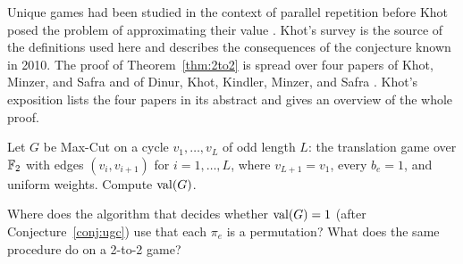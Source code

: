\chapternotes
Unique games had been studied in the context of parallel repetition before Khot posed the problem of approximating their value \cite[Section~2.4]{Khot10}. Khot's survey \cite{Khot10} is the source of the definitions used here and describes the consequences of the conjecture known in 2010. The proof of Theorem~\ref{thm:2to2} is spread over four papers of Khot, Minzer, and Safra and of Dinur, Khot, Kindler, Minzer, and Safra \cite{KMS17,DKKMS,DKKMS21,KMS23}. Khot's exposition \cite{Khot19} lists the four papers in its abstract and gives an overview of the whole proof.

\chapterquestions
\begin{question}\label{q:oddcycle}
Let $G$ be Max-Cut on a cycle $v_1,\dots,v_L$ of odd length $L$: the translation game over $\mathbb{F}_2$ with edges $(v_i,v_{i+1})$ for $i=1,\dots,L$, where $v_{L+1}=v_1$, every $b_e=1$, and uniform weights. Compute $\operatorname{val}(G)$.
\end{question}

\begin{question}\label{q:propagation}
Where does the algorithm that decides whether $\operatorname{val}(G)=1$ (after Conjecture~\ref{conj:ugc}) use that each $\pi_e$ is a permutation? What does the same procedure do on a 2-to-2 game?
\end{question}
